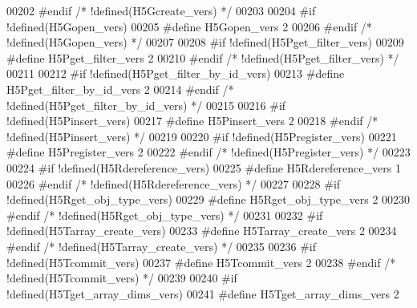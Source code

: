 \begin{DoxyCode}
00202 \textcolor{preprocessor}{#endif }\textcolor{comment}{/* !defined(H5Gcreate\_vers) */}\textcolor{preprocessor}{}
00203 
00204 \textcolor{preprocessor}{#if !defined(H5Gopen\_vers)}
00205 \textcolor{preprocessor}{  #define H5Gopen\_vers 2}
00206 \textcolor{preprocessor}{#endif }\textcolor{comment}{/* !defined(H5Gopen\_vers) */}\textcolor{preprocessor}{}
00207 
00208 \textcolor{preprocessor}{#if !defined(H5Pget\_filter\_vers)}
00209 \textcolor{preprocessor}{  #define H5Pget\_filter\_vers 2}
00210 \textcolor{preprocessor}{#endif }\textcolor{comment}{/* !defined(H5Pget\_filter\_vers) */}\textcolor{preprocessor}{}
00211 
00212 \textcolor{preprocessor}{#if !defined(H5Pget\_filter\_by\_id\_vers)}
00213 \textcolor{preprocessor}{  #define H5Pget\_filter\_by\_id\_vers 2}
00214 \textcolor{preprocessor}{#endif }\textcolor{comment}{/* !defined(H5Pget\_filter\_by\_id\_vers) */}\textcolor{preprocessor}{}
00215 
00216 \textcolor{preprocessor}{#if !defined(H5Pinsert\_vers)}
00217 \textcolor{preprocessor}{  #define H5Pinsert\_vers 2}
00218 \textcolor{preprocessor}{#endif }\textcolor{comment}{/* !defined(H5Pinsert\_vers) */}\textcolor{preprocessor}{}
00219 
00220 \textcolor{preprocessor}{#if !defined(H5Pregister\_vers)}
00221 \textcolor{preprocessor}{  #define H5Pregister\_vers 2}
00222 \textcolor{preprocessor}{#endif }\textcolor{comment}{/* !defined(H5Pregister\_vers) */}\textcolor{preprocessor}{}
00223 
00224 \textcolor{preprocessor}{#if !defined(H5Rdereference\_vers)}
00225 \textcolor{preprocessor}{  #define H5Rdereference\_vers 1}
00226 \textcolor{preprocessor}{#endif }\textcolor{comment}{/* !defined(H5Rdereference\_vers) */}\textcolor{preprocessor}{}
00227 
00228 \textcolor{preprocessor}{#if !defined(H5Rget\_obj\_type\_vers)}
00229 \textcolor{preprocessor}{  #define H5Rget\_obj\_type\_vers 2}
00230 \textcolor{preprocessor}{#endif }\textcolor{comment}{/* !defined(H5Rget\_obj\_type\_vers) */}\textcolor{preprocessor}{}
00231 
00232 \textcolor{preprocessor}{#if !defined(H5Tarray\_create\_vers)}
00233 \textcolor{preprocessor}{  #define H5Tarray\_create\_vers 2}
00234 \textcolor{preprocessor}{#endif }\textcolor{comment}{/* !defined(H5Tarray\_create\_vers) */}\textcolor{preprocessor}{}
00235 
00236 \textcolor{preprocessor}{#if !defined(H5Tcommit\_vers)}
00237 \textcolor{preprocessor}{  #define H5Tcommit\_vers 2}
00238 \textcolor{preprocessor}{#endif }\textcolor{comment}{/* !defined(H5Tcommit\_vers) */}\textcolor{preprocessor}{}
00239 
00240 \textcolor{preprocessor}{#if !defined(H5Tget\_array\_dims\_vers)}
00241 \textcolor{preprocessor}{  #define H5Tget\_array\_dims\_vers 2}

\end{DoxyCode}

